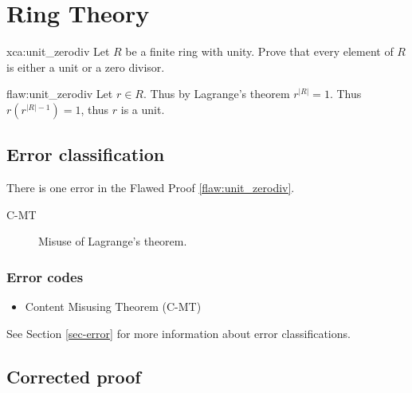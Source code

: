 \section{Ring Theory}

\begin{xca}{xca:unit_zerodiv}
Let $R$ be a finite ring with unity. Prove that every element of $R$ is either a unit or a zero divisor.
\end{xca}

\begin{flaw}{flaw:unit_zerodiv} %
Let $r\in R$. Thus by Lagrange's theorem $r^{|R|} = 1$. Thus $r(r^{|R|-1}) = 1$, thus $r$ is a unit.

\end{flaw}

\clearpage
\subsection{Error classification}


There is one error
 in the Flawed Proof \ref{flaw:unit_zerodiv}.

 \begin{description}
    \item[C-MT] Misuse of Lagrange's theorem.

 	
 \end{description}


\subsubsection{Error codes}
\begin{itemize}
    \item Content Misusing Theorem (C-MT)
\end{itemize}
See Section \ref{sec-error} for more information about error classifications.

\clearpage
\subsection{Corrected proof}

